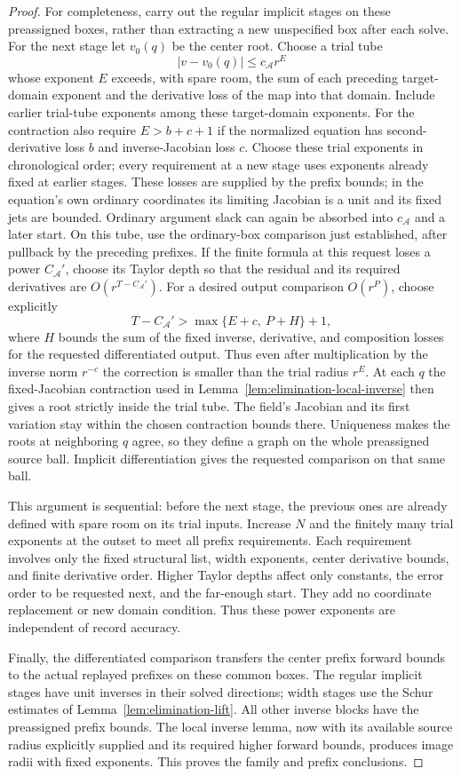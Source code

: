 \begin{proof}
For completeness, carry out the regular implicit stages on these
preassigned boxes, rather than extracting a new unspecified box
after each solve.  For the next stage let $v_0(q)$ be the center
root.  Choose a trial tube
\[
 |v-v_0(q)|\le c_{\mathcal A} r^E
\]
whose exponent $E$ exceeds, with spare room, the sum of each
preceding target-domain exponent and the derivative loss of the
map into that domain.  Include earlier trial-tube exponents among
these target-domain exponents.  For the contraction also require
$E>b+c+1$ if the normalized equation has second-derivative
loss $b$ and inverse-Jacobian loss $c$.  Choose these trial
exponents in chronological order; every requirement at a new
stage uses exponents already fixed at earlier stages.  These
losses are supplied by the prefix bounds; in the equation's own
ordinary coordinates its limiting Jacobian is a unit and its
fixed jets are bounded.  Ordinary
argument slack can again be absorbed into $c_{\mathcal A}$ and a later start.
On this tube, use the ordinary-box comparison just established,
after pullback by the preceding prefixes.  If the finite formula
at this request loses a power $C_{\mathcal A}'$, choose its Taylor depth so
that the residual and its required derivatives are
$O(r^{T-C_{\mathcal A}'})$.  For a desired output comparison $O(r^P)$,
choose explicitly
\[
 T-C_{\mathcal A}'>\max\{E+c,\ P+H\}+1,
\]
where $H$ bounds the sum of the fixed inverse, derivative, and
composition losses for the requested differentiated output.
Thus even after multiplication by the inverse norm $r^{-c}$
the correction is smaller than the trial radius $r^E$.
At each $q$ the fixed-Jacobian contraction
used in Lemma~\ref{lem:elimination-local-inverse} then gives a
root strictly inside the trial tube.  The field's Jacobian and
its first variation stay within the chosen contraction bounds
there.  Uniqueness makes the roots at neighboring $q$ agree, so
they define a graph on the whole preassigned source ball.
Implicit differentiation gives the requested comparison on that
same ball.

This argument is sequential: before the next stage, the previous
ones are already defined with spare room on its trial inputs.
Increase $N$ and the finitely many trial exponents at the outset
to meet all prefix requirements.  Each requirement involves only
the fixed structural list, width exponents, center derivative
bounds, and finite derivative order.  Higher Taylor depths affect
only constants, the error order to be requested next, and the
far-enough start.  They add no coordinate replacement or new
domain condition.  Thus these power exponents are independent
of record accuracy.

Finally, the differentiated comparison transfers the center
prefix forward bounds to the actual replayed prefixes on these
common boxes.  The regular implicit stages have unit inverses
in their solved directions; width stages use the Schur estimates
of Lemma~\ref{lem:elimination-lift}.  All other inverse blocks have
the preassigned prefix bounds.  The local inverse lemma, now with
its available source radius explicitly supplied and its required
higher forward bounds, produces image radii with fixed exponents.
This proves the family and prefix conclusions.
\end{proof}

